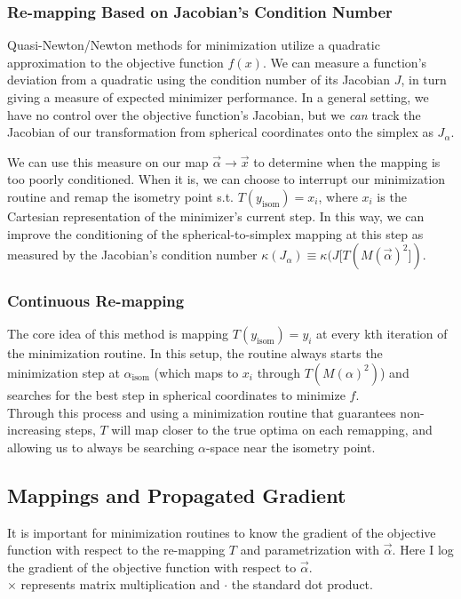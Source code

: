 \documentclass[10pt]{article}
\begin{document}
\subsubsection{Re-mapping Based on Jacobian's Condition Number}\label{kappaTrack}

Quasi-Newton/Newton methods for minimization utilize a quadratic approximation to the objective function $f(x)$. We can measure a function's deviation from a quadratic using the condition number of its Jacobian $J$, in turn giving a measure of expected minimizer performance. In a general setting, we have no control over the objective function's Jacobian, but we \textit{can} track the Jacobian of our transformation from spherical coordinates onto the simplex as $J_\alpha$. 

We can use this measure on our map $\vec{\alpha} \to \vec{x}$ to determine when the mapping is too poorly conditioned. When it is, we can choose to interrupt our minimization routine and remap the isometry point s.t. $T(y_{\text{isom}}) = x_{i}$, where $x_{i}$ is the Cartesian representation of the minimizer's current step. In this way, we can improve the conditioning of the spherical-to-simplex mapping at this step as measured by the Jacobian's condition number $\kappa(J_\alpha) \equiv \kappa(J[T(M(\vec{\alpha})^2])$. 


\subsubsection{Continuous Re-mapping}\label{contRemap}

The core idea of this method is mapping $T(y_{\text{isom}}) = y_{i}$ at every kth iteration of the minimization routine. In this setup, the routine always starts the minimization step at $\alpha_{\text{isom}}$ (which maps to $x_{i}$ through $T(M(\alpha)^2)$) and searches for the best step in spherical coordinates to minimize $f$. \\ Through this process and using a minimization routine that guarantees non-increasing steps, $T$ will map closer to the true optima on each remapping, and allowing us to always be searching $\alpha$-space near the isometry point. \\ 


\newpage
\subsection{Mappings and Propagated Gradient}

It is important for minimization routines to know the gradient of the objective function with respect to the re-mapping $T$ and parametrization with $\vec{\alpha}$. Here I log the gradient of the objective function with respect to $\vec{\alpha}$. \\ $\times$ represents matrix multiplication and $\cdot$ the standard dot product. \\
\end{document}
